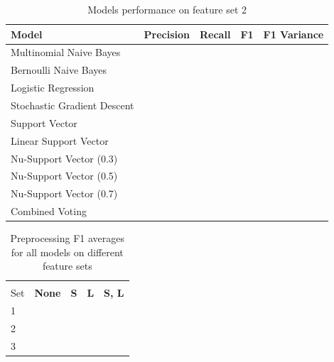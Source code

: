 \documentclass[11pt,oneside]{book}
\begin{document}
\begin{longtable}{|l|l|l|l|l|}
\caption{Models performance on feature set 2}
\label{tab:ner_re_feature_set_2}\\
\hline
\textbf{Model}          & \multicolumn{1}{c|}{\textbf{Precision}} & \multicolumn{1}{c|}{\textbf{Recall}} & \textbf{F1} & \textbf{F1 Variance} \\ \hline
\endfirsthead
%
\endhead
%
Multinomial Naive Bayes & \multicolumn{1}{c|}{}                   & \multicolumn{1}{c|}{}                &             &                      \\ \hline
Bernoulli Naive Bayes       &  &  &  &  \\ \hline
Logistic Regression         &  &  &  &  \\ \hline
Stochastic Gradient Descent &  &  &  &  \\ \hline
Support Vector              &  &  &  &  \\ \hline
Linear Support Vector       &  &  &  &  \\ \hline
Nu-Support Vector (0.3)     &  &  &  &  \\ \hline
Nu-Support Vector (0.5)     &  &  &  &  \\ \hline
Nu-Support Vector (0.7)     &  &  &  &  \\ \hline
Combined Voting             &  &  &  &  \\ \hline
\end{longtable}

\begin{longtable}[c]{|l|l|l|l|l|}
\caption{Preprocessing F1 averages for all models on different feature sets}
\label{tab:ner_re_preprocessing}\\
\hline
\textbf{\begin{tabular}[c]{@{}l@{}}Feature \\ Set\end{tabular}} & \multicolumn{1}{c|}{\textbf{None}} & \multicolumn{1}{c|}{\textbf{S}} & \multicolumn{1}{c|}{\textbf{L}} & \multicolumn{1}{c|}{\textbf{S, L}} \\ \hline
\endfirsthead
%
\endhead
%
1                                                               & \multicolumn{1}{c|}{}              & \multicolumn{1}{c|}{}           &                                 &                                    \\ \hline
2                                                               &                                    &                                 &                                 &                                    \\ \hline
3                                                               &                                    &                                 &                                 &                                    \\ \hline
\end{longtable}
\end{document}
